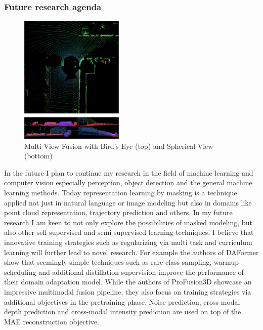 \subsubsection{Future research agenda}
\begin{figure}
    \includegraphics[width=140pt]{pic/fusion.png}
    \mainfont\fontsize{9pt}{9pt}\selectfont\caption{ \mainfont\fontsize{9pt}{9pt}\selectfont Multi View Fusion with Bird's Eye (top)
    and Spherical View (bottom)}
    \label{fig:fusion}
    \end{figure}
In the future I plan to continue my research in the field of machine learning and computer vision 
especially perception, object detection and the general machine learning methods.
Today representation learning by masking is a technique applied not just in natural language or image modeling 
but also in domains like point cloud representation, trajectory prediction and others. In my future research 
I am keen to not only explore the possibilities of
masked modeling, but also other
self-supervised and semi supervised learning techniques. 
I believe that innovative training strategies such as
regularizing via multi task and curriculum learning will further lead to novel research. 
For example the authors of DAFormer \cite{hoyer} show that
seemingly simple techniques such as rare class sampling, warmup scheduling and additional distillation supervision improve the performance of 
their domain adaptation model.
While the authors of ProFusion3D \cite{valada} showcase an impressive multimodal fusion pipeline, they 
also focus on training strategies via additional objectives in the pretraining phase. 
Noise prediction, cross-modal depth prediction and cross-modal intensity prediction are used on top of the MAE reconstruction objective.

